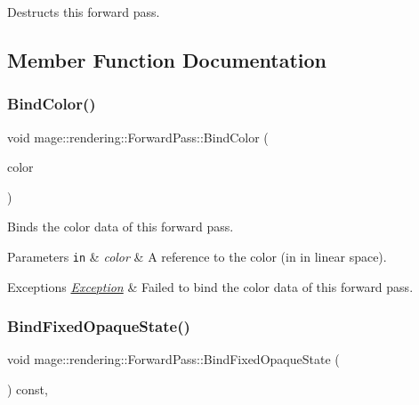 Destructs this forward pass. 

\subsection{Member Function Documentation}
\mbox{\label{classmage_1_1rendering_1_1_forward_pass_a1431c5d2bd8cccc55427aa1cf9a64845}} 
\subsubsection{\texorpdfstring{Bind\+Color()}{BindColor()}}
{\footnotesize\ttfamily void mage\+::rendering\+::\+Forward\+Pass\+::\+Bind\+Color (\begin{DoxyParamCaption}\item[{const \mbox{\hyperlink{structmage_1_1_r_g_b_a}{R\+G\+BA}} \&}]{color }\end{DoxyParamCaption})\hspace{0.3cm}{\ttfamily [private]}}

Binds the color data of this forward pass.


\begin{DoxyParams}[1]{Parameters}
\mbox{\tt in}  & {\em color} & A reference to the color (in in linear space). \\
\hline
\end{DoxyParams}

\begin{DoxyExceptions}{Exceptions}
{\em \mbox{\hyperlink{classmage_1_1_exception}{Exception}}} & Failed to bind the color data of this forward pass. \\
\hline
\end{DoxyExceptions}
\mbox{\label{classmage_1_1rendering_1_1_forward_pass_af66584e7efc3565f23f7b5940d6f35eb}} 
\subsubsection{\texorpdfstring{Bind\+Fixed\+Opaque\+State()}{BindFixedOpaqueState()}}
{\footnotesize\ttfamily void mage\+::rendering\+::\+Forward\+Pass\+::\+Bind\+Fixed\+Opaque\+State (\begin{DoxyParamCaption}{ }\end{DoxyParamCaption}) const\hspace{0.3cm}{\ttfamily [private]}, {\ttfamily [noexcept]}}

